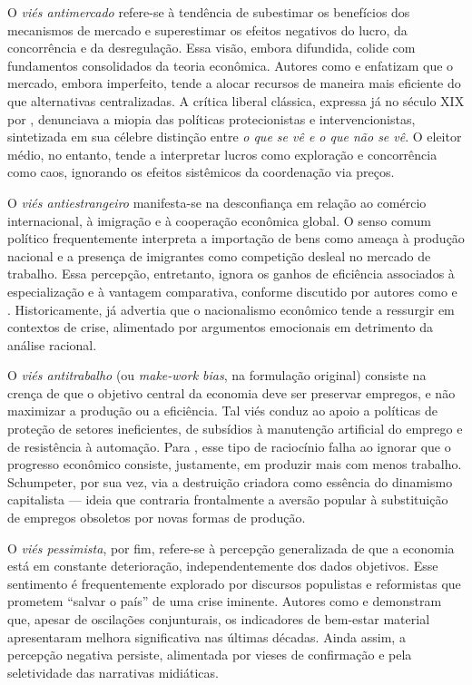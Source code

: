 O \textit{viés antimercado} refere-se à tendência de subestimar os benefícios dos mecanismos de mercado e superestimar os efeitos negativos do lucro, da concorrência e da desregulação. Essa visão, embora difundida, colide com fundamentos consolidados da teoria econômica. Autores como  e  enfatizam que o mercado, embora imperfeito, tende a alocar recursos de maneira mais eficiente do que alternativas centralizadas. A crítica liberal clássica, expressa já no século XIX por , denunciava a miopia das políticas protecionistas e intervencionistas, sintetizada em sua célebre distinção entre \textit{o que se vê e o que não se vê}. O eleitor médio, no entanto, tende a interpretar lucros como exploração e concorrência como caos, ignorando os efeitos sistêmicos da coordenação via preços.

O \textit{viés antiestrangeiro} manifesta-se na desconfiança em relação ao comércio internacional, à imigração e à cooperação econômica global. O senso comum político frequentemente interpreta a importação de bens como ameaça à produção nacional e a presença de imigrantes como competição desleal no mercado de trabalho. Essa percepção, entretanto, ignora os ganhos de eficiência associados à especialização e à vantagem comparativa, conforme discutido por autores como  e . Historicamente,  já advertia que o nacionalismo econômico tende a ressurgir em contextos de crise, alimentado por argumentos emocionais em detrimento da análise racional.

O \textit{viés antitrabalho} (ou \textit{make-work bias}, na formulação original) consiste na crença de que o objetivo central da economia deve ser preservar empregos, e não maximizar a produção ou a eficiência. Tal viés conduz ao apoio a políticas de proteção de setores ineficientes, de subsídios à manutenção artificial do emprego e de resistência à automação. Para , esse tipo de raciocínio falha ao ignorar que o progresso econômico consiste, justamente, em produzir mais com menos trabalho. Schumpeter, por sua vez, via a destruição criadora como essência do dinamismo capitalista — ideia que contraria frontalmente a aversão popular à substituição de empregos obsoletos por novas formas de produção.

O \textit{viés pessimista}, por fim, refere-se à percepção generalizada de que a economia está em constante deterioração, independentemente dos dados objetivos. Esse sentimento é frequentemente explorado por discursos populistas e reformistas que prometem ``salvar o país'' de uma crise iminente. Autores como  e  demonstram que, apesar de oscilações conjunturais, os indicadores de bem-estar material apresentaram melhora significativa nas últimas décadas. Ainda assim, a percepção negativa persiste, alimentada por vieses de confirmação e pela seletividade das narrativas midiáticas.

